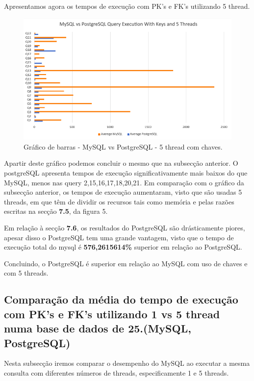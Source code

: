 \documentclass{article}
\begin{document}
Apresentamos agora os tempos de execução com PK's e FK's utilizando 5 thread.
\begin{figure}[H]
  \centering
  \includegraphics[width=\textwidth]{Graphs/mysqlvspostgres_withkeys_fivethreads.png}
  \caption{Gráfico de barras - MySQL vs PostgreSQL - 5 thread com chaves.}
  \label{fig:PKCreation2}
\end{figure}


Apartir deste gráfico podemos concluir o mesmo que na subsecção anterior. O postgreSQL apresenta tempos de execução significativamente mais baixos do que MySQL, menos nas query 2,15,16,17,18,20,21.
Em comparação com o gráfico da subsecção anterior, os tempos de execução aumentaram, visto que são usadas 5 threads, em que têm de dividir os recursos tais como memória e pelas razões escritas na secção \textbf{7.5}, da figura 5. 

Em relação à secção \textbf{7.6}, os resultados do PostgreSQL são drásticamente piores, apesar disso o PostgreSQL tem uma grande vantagem, visto que o tempo de execução total do mysql é \textbf{576,2615614\%} superior em relação ao PostgreSQL.

Concluindo, o PostgreSQL é superior em relação ao MySQL com uso de chaves e com 5 threads.
\clearpage
  \subsection{Comparação da média do tempo de execução com PK's e FK's
  utilizando 1 vs 5 thread numa base de dados de 25.(MySQL, PostgreSQL)}
  
  \texttt{}\par Nesta subsecção iremos comparar o desempenho do MySQL ao executar a mesma consulta com diferentes números de threads, especificamente 1 e 5 threads. 
  
\end{document}
